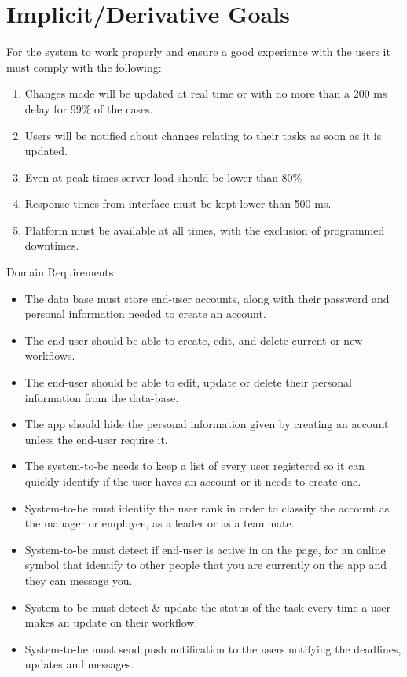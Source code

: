 \documentclass{article}
\begin{document}
\section{Implicit/Derivative Goals}
\vspace{10}
For the system to work properly and ensure a good experience with the users it must comply with the following:
\begin{enumerate}
  \item Changes made will be updated at real time or with no more than a 200 ms delay for 99\% of the cases.
  \item Users will be notified about changes relating to their tasks as soon as it is updated.
  \item Even at peak times server load should be lower than 80\%
  \item Response times from interface must be kept lower than 500 ms.
  \item Platform must be available at all times, with the exclusion of programmed downtimes.
\end{enumerate}
\vspace{40}
Domain Requirements:
\begin{itemize}
    \item The data base must store end-user accounts, along with their password and personal information needed to create an account.
    \item The end-user should be able to create, edit, and delete current or new workflows.
    \item The end-user should be able to edit, update or delete their personal information from the data-base.
    \item The app should hide the personal information given by creating an account unless the end-user require it.
    \item The system-to-be needs to keep a list of every user registered so it can quickly identify if the user haves an account or it needs to create one.
    \item System-to-be must identify the user \“rank\” in order to classify the account as the manager or employee, as a leader or as a teammate.
    \item System-to-be must detect if end-user is active in on the page, for an online symbol that identify to other people that you are currently on the app and they can message you.
    \item System-to-be must detect & update the status of the task every time a user makes an update on their workflow.
    \item System-to-be must send push notification to the users notifying the deadlines, updates and messages.
\end{itemize}
\end{document}
